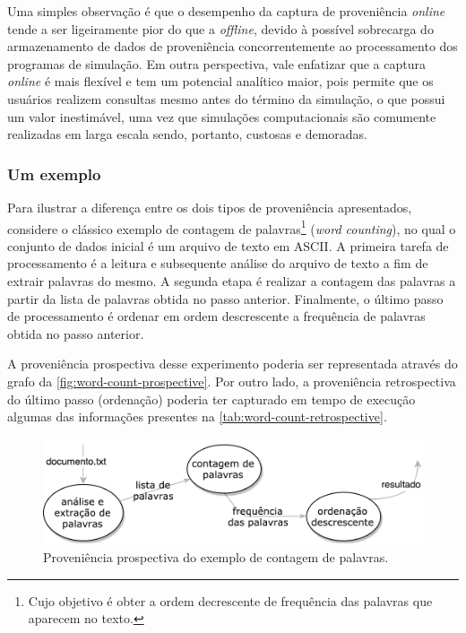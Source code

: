 Uma simples observação é que o desempenho da captura de proveniência \textit{online} tende a ser ligeiramente pior do que a \textit{offline}, devido à possível sobrecarga do armazenamento de dados de proveniência concorrentemente ao processamento dos programas de simulação. Em outra perspectiva, vale enfatizar que a captura \textit{online} é mais flexível e tem um potencial analítico maior, pois permite que os usuários realizem consultas mesmo antes do término da simulação, o que possui um valor inestimável, uma vez que simulações computacionais são comumente realizadas em larga escala sendo, portanto, custosas e demoradas.

\subsubsection{Um exemplo}

Para ilustrar a diferença entre os dois tipos de proveniência apresentados, considere o clássico exemplo de contagem de palavras\footnote{Cujo objetivo é obter a ordem decrescente de frequência das palavras que aparecem no texto.} (\textit{word counting}), no qual o conjunto de dados inicial é um arquivo de texto em  ASCII. A primeira tarefa de processamento é a leitura e subsequente análise do arquivo de texto a fim de extrair palavras do mesmo. A segunda etapa é realizar a contagem das palavras a partir da lista de palavras obtida no passo anterior. Finalmente, o último passo de processamento é ordenar em ordem descrescente a frequência de palavras obtida no passo anterior.

A proveniência prospectiva desse experimento poderia ser representada através do grafo da \autoref{fig:word-count-prospective}. Por outro lado, a proveniência retrospectiva do último passo (ordenação) poderia ter capturado em tempo de execução algumas das informações presentes na \autoref{tab:word-count-retrospective}.

\begin{figure}[htb]
    \centering
    \includegraphics[width=\textwidth]{img/word-count-prospective}
    \caption[Proveniência prospectiva do exemplo de contagem de palavras]{Proveniência prospectiva do exemplo de contagem de palavras.}%
    \label{fig:word-count-prospective}
\end{figure}

